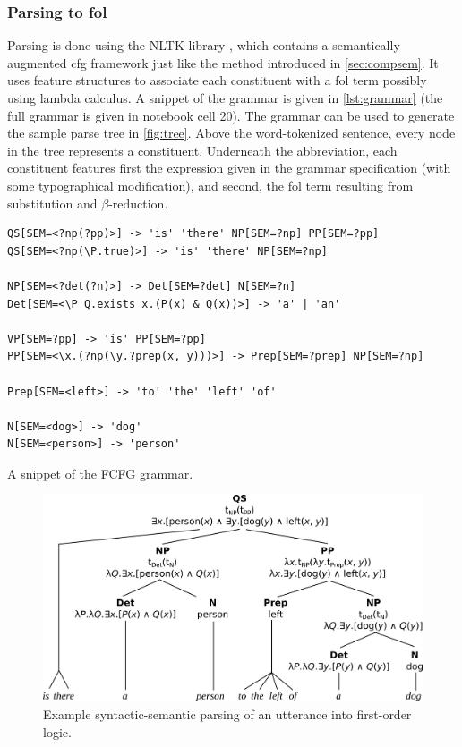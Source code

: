 \subsubsection{Parsing to \gls{fol}}

Parsing is done using the NLTK library \citep{nltk}, which contains a semantically augmented \gls{cfg} framework just like the method introduced in \autoref{sec:compsem}.
It uses feature structures to associate each constituent with a \gls{fol} term possibly using lambda calculus.
A snippet of the grammar is given in \autoref{lst:grammar} (the full grammar is given in notebook cell 20).
The grammar can be used to generate the sample parse tree in \autoref{fig:tree}.
Above the word-tokenized sentence, every node in the tree represents a constituent.
Underneath the abbreviation, each constituent features first the expression given in the grammar specification (with some typographical modification), and second, the \gls{fol} term resulting from substitution and $\beta$-reduction.

\begin{listing}
\begin{lstlisting}
QS[SEM=<?np(?pp)>] -> 'is' 'there' NP[SEM=?np] PP[SEM=?pp]
QS[SEM=<?np(\P.true)>] -> 'is' 'there' NP[SEM=?np]

NP[SEM=<?det(?n)>] -> Det[SEM=?det] N[SEM=?n]
Det[SEM=<\P Q.exists x.(P(x) & Q(x))>] -> 'a' | 'an'

VP[SEM=?pp] -> 'is' PP[SEM=?pp]
PP[SEM=<\x.(?np(\y.?prep(x, y)))>] -> Prep[SEM=?prep] NP[SEM=?np]

Prep[SEM=<left>] -> 'to' 'the' 'left' 'of'

N[SEM=<dog>] -> 'dog'
N[SEM=<person>] -> 'person'
\end{lstlisting}
\caption{A snippet of the FCFG grammar.}
\label{lst:grammar}
\end{listing}

\begin{figure}[h]
\includegraphics[width=\textwidth]{tree}
\centering
\caption{Example syntactic-semantic parsing of an utterance into first-order logic.}
\label{fig:tree}
\end{figure}



